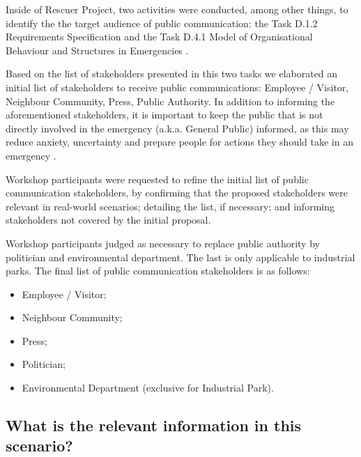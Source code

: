 Inside of Rescuer Project, two activities were conducted, among other things, to identify the the target audience of public communication: the Task D.1.2 Requirements Specification \citep{rescuerD11} and the Task D.4.1 Model of Organisational Behaviour and Structures in Emergencies \citep{rescuerD41}. 

Based on the list of stakeholders presented in this two tasks we elaborated an initial list of stakeholders to receive public communications: Employee / Visitor, Neighbour Community, Press, Public Authority. In addition to informing the aforementioned stakeholders, it is important to keep the public that is not directly involved in the emergency (a.k.a. General Public) informed, as this may reduce anxiety, uncertainty and prepare people for actions they should take in an emergency \citep{cdc2014}.

Workshop participants were requested to refine the initial list of public communication stakeholders, by confirming that the proposed stakeholders were relevant in real-world scenarios; detailing the list, if necessary; and informing stakeholders not covered by the initial proposal.

Workshop participants judged as necessary to replace public authority by politician and environmental department. The last is only applicable to industrial parks. The final list of public communication stakeholders is as follows:


\begin{itemize}
   \item Employee / Visitor;
   \item Neighbour Community;
   \item Press;
   \item Politician;
   \item Environmental Department (exclusive for Industrial Park).
        
 \end{itemize}


\subsection*{What is the relevant information in this scenario?}


